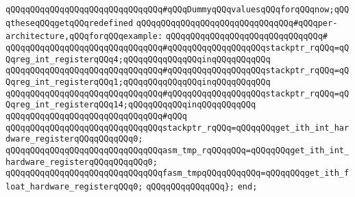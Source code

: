 \newline
\verb|qQQqqQQqqQQqqQQqqQQqqQQqqQQqqQQq#qQQqDummyqQQqvaluesqQQqforqQQqnow;qQQqtheseqQQqgetqQQqredefined|\newline
\verb|qQQqqQQqqQQqqQQqqQQqqQQqqQQqqQQq#qQQqper-architecture,qQQqforqQQqexample:|\newline
\verb|qQQqqQQqqQQqqQQqqQQqqQQqqQQqqQQq#|\newline
\verb|qQQqqQQqqQQqqQQqqQQqqQQqqQQqqQQq#qQQqqQQqqQQqqQQqqQQqstackptr_rqQQq=qQQqreg_int_registerqQQq4;qQQqqQQqqQQqqQQqinqQQqqQQqqQQq|\newline
\verb|qQQqqQQqqQQqqQQqqQQqqQQqqQQqqQQq#qQQqqQQqqQQqqQQqqQQqstackptr_rqQQq=qQQqreg_int_registerqQQq1;qQQqqQQqqQQqqQQqinqQQqqQQqqQQq|\newline
\verb|qQQqqQQqqQQqqQQqqQQqqQQqqQQqqQQq#qQQqqQQqqQQqqQQqqQQqstackptr_rqQQq=qQQqreg_int_registerqQQq14;qQQqqQQqqQQqinqQQqqQQqqQQq|\newline
\verb|qQQqqQQqqQQqqQQqqQQqqQQqqQQqqQQq#qQQq|\newline
\verb|qQQqqQQqqQQqqQQqqQQqqQQqqQQqqQQqstackptr_rqQQq=qQQqqQQqget_ith_int_hardware_registerqQQqqQQqqQQq0;|\newline
\verb|qQQqqQQqqQQqqQQqqQQqqQQqqQQqqQQqasm_tmp_rqQQqqQQq=qQQqqQQqget_ith_int_hardware_registerqQQqqQQqqQQq0;|\newline
\verb|qQQqqQQqqQQqqQQqqQQqqQQqqQQqqQQqfasm_tmpqQQqqQQqqQQq=qQQqqQQqget_ith_float_hardware_registerqQQq0;|\newline
\verb|qQQqqQQqqQQqqQQq};|\newline
\verb|end;|\newline

